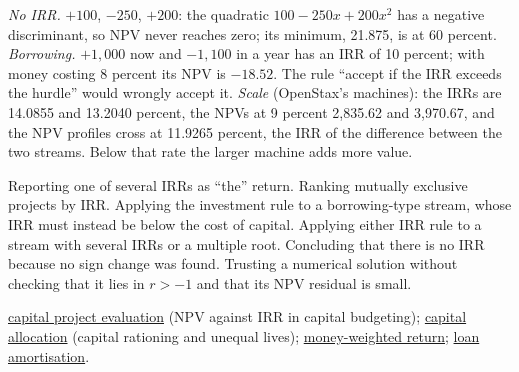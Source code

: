 \begin{qfmethod}
\emph{No IRR.} $+100$, $-250$, $+200$: the quadratic $100-250x+200x^2$ has a negative discriminant, so NPV never reaches zero; its minimum, 21.875, is at 60 percent. \emph{Borrowing.} $+1{,}000$ now and $-1{,}100$ in a year has an IRR of 10 percent; with money costing 8 percent its NPV is $-18.52$. The rule ``accept if the IRR exceeds the hurdle'' would wrongly accept it. \emph{Scale} (OpenStax's machines): the IRRs are 14.0855 and 13.2040 percent, the NPVs at 9 percent 2{,}835.62 and 3{,}970.67, and the NPV profiles cross at 11.9265 percent, the IRR of the difference between the two streams. Below that rate the larger machine adds more value.

 Reporting one of several IRRs as ``the'' return. Ranking mutually exclusive projects by IRR. Applying the investment rule to a borrowing-type stream, whose IRR must instead be below the cost of capital. Applying either IRR rule to a stream with several IRRs or a multiple root. Concluding that there is no IRR because no sign change was found. Trusting a numerical solution without checking that it lies in $r>-1$ and that its NPV residual is small.

 \hyperref[meth:capital-project-evaluation]{capital project evaluation} (NPV against IRR in capital budgeting); \hyperref[meth:capital-allocation-principles]{capital allocation} (capital rationing and unequal lives); \hyperref[def:return-measures]{money-weighted return}; \hyperref[meth:loan-amortisation]{loan amortisation}.

\end{qfmethod}

